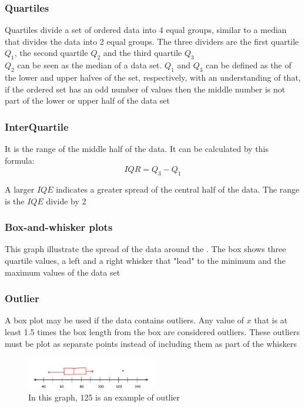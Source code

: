 \subsubsection{Quartiles}
Quartiles divide a set of ordered data into 4 equal groups, similar to a median that divides the data into 2 
equal groups. The three dividers are the first quartile $Q_1$, the second quartile $Q_2$ and the third quartile
$Q_3$\\

$Q_2$ can be seen as the median of a data set. $Q_1$ and $Q_3$ can be defined as the  of the lower and upper
halves of the set, respectively, with an understanding of that, if the ordered set has an odd number of values then the
middle number is not part of the lower or upper half of the data set

\subsubsection{InterQuartile}
It is the range of the middle half of the data. It can be calculated by this formula:
\[
    IQR = Q_3 - Q_1
\]

A larger $IQE$ indicates a greater spread of the central half of the data. The  range is the 
$IQE$ divide by 2

\subsubsection{Box-and-whisker plots}
    This graph illustrate the spread of the data around the . The box shows three quartile values, a left and a 
right whisker that "lead" to the minimum and the maximum values of the data set


\subsubsection{Outlier}
A  box plot may be used if the data contains outliers. Any value of $x$ that is at 
least 1.5 times the box length from the box are considered outliers. These outliers must be plot 
as separate points instead of including them as part of the whiskers
\begin{figure}[h!]
    \centering
    \includegraphics[width=0.5\textwidth]{pictures/3.4.1.2.png}
    \caption{In this graph, 125 is an example of outlier}
\end{figure}

